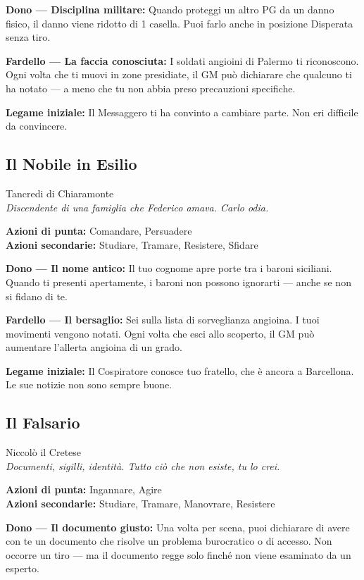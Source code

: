 \textbf{Dono — Disciplina militare:} Quando proteggi un altro PG da
un danno fisico, il danno viene ridotto di 1 casella. Puoi farlo
anche in posizione Disperata senza tiro.

\textbf{Fardello — La faccia conosciuta:} I soldati angioini di Palermo
ti riconoscono. Ogni volta che ti muovi in zone presidiate, il GM può
dichiarare che qualcuno ti ha notato — a meno che tu non abbia preso
precauzioni specifiche.

\textbf{Legame iniziale:} Il Messaggero ti ha convinto a cambiare
parte. Non eri difficile da convincere.

\filetto

\subsection{Il Nobile in Esilio}
{\cinzel\footnotesize\color{grigionote} Tancredi di Chiaramonte}\\
\textit{Discendente di una famiglia che Federico amava. Carlo odia.}

\textbf{Azioni di punta:} Comandare, Persuadere\\
\textbf{Azioni secondarie:} Studiare, Tramare, Resistere, Sfidare

\textbf{Dono — Il nome antico:} Il tuo cognome apre porte tra i baroni
siciliani. Quando ti presenti apertamente, i baroni non possono
ignorarti — anche se non si fidano di te.

\textbf{Fardello — Il bersaglio:} Sei sulla lista di sorveglianza
angioina. I tuoi movimenti vengono notati. Ogni volta che esci
allo scoperto, il GM può aumentare l'allerta angioina di un grado.

\textbf{Legame iniziale:} Il Cospiratore conosce tuo fratello, che
è ancora a Barcellona. Le sue notizie non sono sempre buone.

\filetto

\subsection{Il Falsario}
{\cinzel\footnotesize\color{grigionote} Niccolò il Cretese}\\
\textit{Documenti, sigilli, identità. Tutto ciò che non esiste, tu lo crei.}

\textbf{Azioni di punta:} Ingannare, Agire\\
\textbf{Azioni secondarie:} Studiare, Tramare, Manovrare, Resistere

\textbf{Dono — Il documento giusto:} Una volta per scena, puoi
dichiarare di avere con te un documento che risolve un problema
burocratico o di accesso. Non occorre un tiro — ma il documento
regge solo finché non viene esaminato da un esperto.

